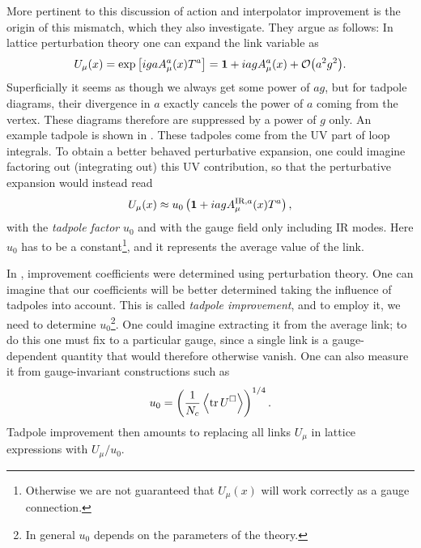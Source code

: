 More pertinent to this discussion of action and interpolator improvement
is the origin of this mismatch, which they also investigate. They argue as
follows: In lattice perturbation theory one can expand the link variable as
\begin{equation}
  U_\mu(x)=\exp\left[igaA_\mu^a(x)T^a\right]
          =\id+iagA_\mu^a(x)+\order{a^2g^2}.
\end{equation}
Superficially it seems as though we always get some power of $ag$, but for
tadpole diagrams, their divergence in $a$ exactly cancels the power of $a$ 
coming from the vertex. These diagrams therefore are suppressed by a
power of $g$ only. An example tadpole is shown in .
These tadpoles come from the UV part of loop integrals. To obtain a
better behaved perturbative expansion, one could imagine factoring out
(integrating out) this UV contribution, so that the perturbative expansion
would instead read
\begin{equation}
  U_\mu(x)\approx u_0\left({\mathbf 1}+iagA^{\text{IR},a}_\mu(x)T^a\right),
\end{equation}
with the {\it tadpole factor} $u_0$ and with the gauge field only 
including
IR modes. Here $u_0$ has to be a constant\footnote{Otherwise we are not
guaranteed that $U_\mu(x)$ will work correctly as a gauge connection.}, 
and it represents the average value of the link.

In , improvement coefficients were
determined using perturbation theory. One can imagine that our coefficients
will be better determined taking the influence of tadpoles into account.
This is called {\it tadpole improvement}, and to employ it, we need to
determine $u_0$\footnote{In general $u_0$ depends on the parameters of the
theory.}. One could imagine extracting it from the average link; to do
this one must fix to a particular gauge, since a single link is a
gauge-dependent quantity that would therefore otherwise vanish. One
can also measure it from gauge-invariant constructions such as
\begin{equation}
  u_0=\left(\frac{1}{N_c}\ev{\tr \plaq}\right)^{1/4}.
\end{equation}
Tadpole improvement then amounts to replacing all links $U_\mu$ in lattice
expressions with $U_\mu/u_0$.

